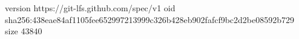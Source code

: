 version https://git-lfs.github.com/spec/v1
oid sha256:438eae84af1105fee652997213999c326b428eb902fafcf9bc2d2be08592b729
size 43840
